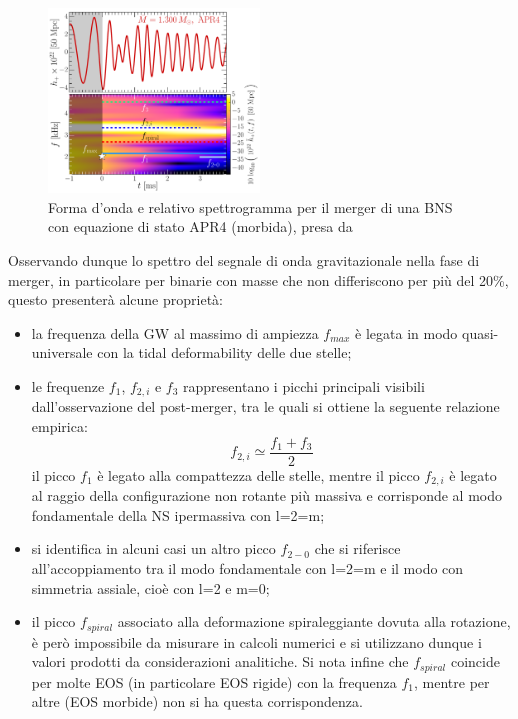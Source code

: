 \begin{figure}
	\vspace{-15pt}
	\begin{center}
		\includegraphics[width=0.5\textwidth]{figures/Capitolo_1/GW_spectrogram_short_APR4-q10-M1300.pdf}
	\end{center}
	\vspace{-10pt}
	\caption{Forma d'onda e relativo spettrogramma per il merger di una BNS con equazione di stato APR4 (morbida), presa da \cite{Rezzolla_2016}}
	\label{fig:spettrogramma_merger_APR4}
	\vspace{-25pt}
\end{figure}
Osservando dunque lo spettro del segnale di onda gravitazionale nella fase di merger, in particolare per binarie con masse che non differiscono per più del 20\%, questo presenterà alcune proprietà\cite{Rezzolla_2016}:
\begin{itemize}
   	\item la frequenza della GW al massimo di ampiezza $f_{max}$ è legata in modo quasi-universale con la tidal deformability delle due stelle;
   	\item le frequenze $f_1$, $f_{2,i}$ e $f_3$ rappresentano i picchi principali visibili dall'osservazione del post-merger, tra le quali si ottiene la seguente relazione empirica:
   	\begin{equation}
   		f_{2,i}\simeq\frac{f_1 + f_3}{2} 
   		\label{eqn:f1_2_3}
   	\end{equation} 
   	il picco $f_1$ è legato alla compattezza delle stelle, mentre il picco $f_{2,i}$ è legato al raggio della configurazione non rotante più massiva e corrisponde al modo fondamentale della NS ipermassiva con l=2=m;
\end{itemize}

\begin{itemize}
   	\item si identifica in alcuni casi un altro picco $f_{2-0}$ che si riferisce all'accoppiamento tra il modo fondamentale con l=2=m e il modo con simmetria assiale, cioè con l=2 e m=0;
   	\item il picco $f_{spiral}$ associato alla deformazione spiraleggiante dovuta alla rotazione, è però impossibile da misurare in calcoli numerici e si utilizzano dunque i valori prodotti da considerazioni analitiche. Si nota infine che $f_{spiral}$ coincide per molte EOS (in particolare EOS rigide) con la frequenza $f_1$, mentre per altre (EOS morbide) non si ha questa corrispondenza.
\end{itemize}

